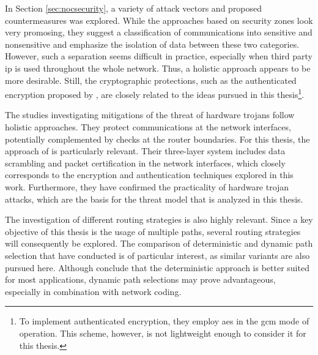 In Section \ref{sec:nocsecurity}, a variety of attack vectors and proposed countermeasures was explored. While the approaches based on security zones
look very promosing, they suggest a classification of communications into sensitive and nonsensitive and emphasize the isolation of data between these two
categories. However, such a separation seems difficult in practice, especially when third party \gls{ip} is used throughout the whole network. Thus, a
holistic approach appears to be more desirable. Still, the cryptographic protections, such as the authenticated encryption proposed by
\citeauthor{kapoor13nocauthenc} \cite{kapoor13nocauthenc}, are closely related to the ideas pursued in this thesis\footnote{To implement authenticated
encryption, they employ \gls{aes} in the \gls{gcm} mode of operation. This scheme, however, is not lightweight enough to consider it for this thesis.}.

The studies investigating mitigations of the threat of hardware trojans follow holistic approaches. They protect communications at the network
interfaces, potentially complemented by checks at the router boundaries. For this thesis, the approach of \citeauthor{ancajas14fortnocs}
\cite{ancajas14fortnocs} is particularly relevant. Their three-layer system includes data scrambling and packet certification in the network
interfaces, which closely corresponds to the encryption and authentication techniques explored in this work. Furthermore, they have confirmed the
practicality of hardware trojan attacks, which are the basis for the threat model that is analyzed in this thesis.

The investigation of different routing strategies is also highly relevant. Since a key objective of this thesis is the usage of multiple paths, several
routing strategies will consequently be explored. The comparison of deterministic and dynamic path selection that \citeauthor{stefan11enhancingnocs}
\cite{stefan11enhancingnocs} have conducted is of particular interest, as similar variants are also pursued here. Although
\citeauthor{stefan11enhancingnocs} conclude that the deterministic approach is better suited for most applications, dynamic path selections may prove
advantageous, especially in combination with network coding.

